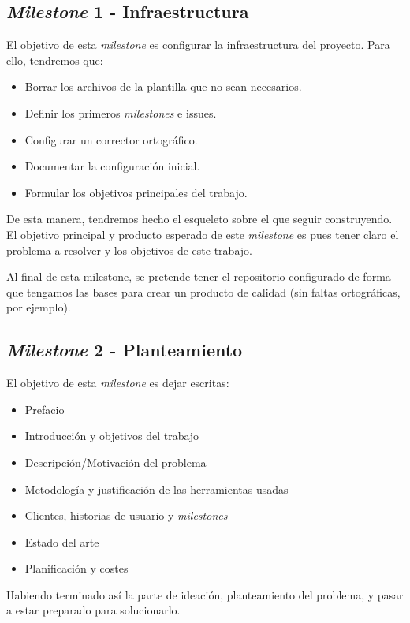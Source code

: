\subsection{\textit{Milestone} 1 - Infraestructura}
El objetivo de esta \textit{milestone} es configurar la infraestructura del proyecto. Para ello, tendremos que:
\begin{itemize}
    \item Borrar los archivos de la plantilla que no sean necesarios.
    \item Definir los primeros \textit{milestones} e issues.
    \item Configurar un corrector ortográfico.
    \item Documentar la configuración inicial.
    \item Formular los objetivos principales del trabajo.
\end{itemize} 
De esta manera, tendremos hecho el esqueleto sobre el que seguir construyendo. El objetivo principal y 
producto esperado de este \textit{milestone} es pues tener claro el problema a resolver y los objetivos 
de este trabajo.
   
Al final de esta milestone, se pretende tener el repositorio configurado de forma que tengamos las 
bases para crear un producto de calidad (sin faltas ortográficas, por ejemplo).

\subsection{\textit{Milestone} 2 - Planteamiento}
El objetivo de esta \textit{milestone} es dejar escritas:

\begin{itemize}
    \item Prefacio
    \item Introducción y objetivos del trabajo
    \item Descripción/Motivación del problema
    \item Metodología y justificación de las herramientas usadas
    \item Clientes, historias de usuario y \textit{milestones}
    \item Estado del arte
    \item Planificación y costes
\end{itemize}

Habiendo terminado así la parte de ideación, planteamiento del problema, y pasar a estar preparado para solucionarlo.

